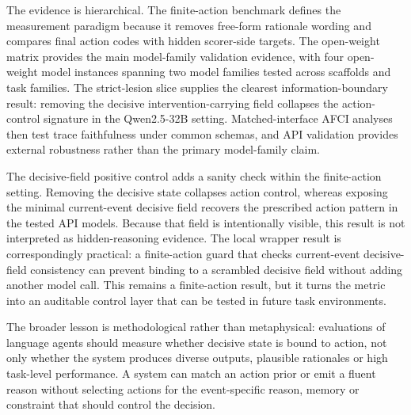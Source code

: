 ﻿\documentclass[preprint,12pt,authoryear]{elsarticle}
\begin{document}
The evidence is hierarchical. The finite-action benchmark defines the measurement paradigm because it removes free-form rationale wording and compares final action codes with hidden scorer-side targets. The open-weight matrix provides the main model-family validation evidence, with four open-weight model instances spanning two model families tested across scaffolds and task families. The strict-lesion slice supplies the clearest information-boundary result: removing the decisive intervention-carrying field collapses the action-control signature in the Qwen2.5-32B setting. Matched-interface AFCI analyses then test trace faithfulness under common schemas, and API validation provides external robustness rather than the primary model-family claim.

The decisive-field positive control adds a sanity check within the finite-action setting. Removing the decisive state collapses action control, whereas exposing the minimal current-event decisive field recovers the prescribed action pattern in the tested API models. Because that field is intentionally visible, this result is not interpreted as hidden-reasoning evidence. The local wrapper result is correspondingly practical: a finite-action guard that checks current-event decisive-field consistency can prevent binding to a scrambled decisive field without adding another model call. This remains a finite-action result, but it turns the metric into an auditable control layer that can be tested in future task environments.

The broader lesson is methodological rather than metaphysical: evaluations of language agents should measure whether decisive state is bound to action, not only whether the system produces diverse outputs, plausible rationales or high task-level performance. A system can match an action prior or emit a fluent reason without selecting actions for the event-specific reason, memory or constraint that should control the decision.
\end{document}
